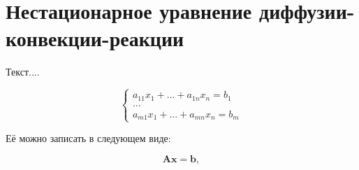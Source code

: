 \documentclass[12pt]{article}
\begin{document}
\section{Нестационарное уравнение диффузии-конвекции-реакции}

Текст....

\begin{equation}
	\begin{cases}
		a_{11}x_1 + ... + a_{1n}x_n = b_1\\
		...\\
		a_{m1}x_1 + ... + a_{mn}x_n = b_m
	\end{cases}
\end{equation}

Её можно записать в следующем виде:

\begin{equation}
	\mathbf{Ax = b},
\end{equation}
\end{document}
